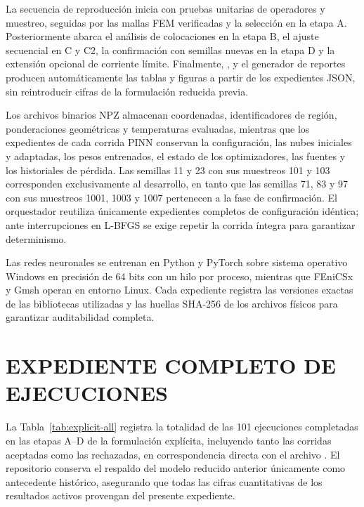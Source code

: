 La secuencia de reproducción inicia con pruebas unitarias de operadores y muestreo, seguidas por las mallas FEM verificadas y la selección en la etapa A. Posteriormente abarca el análisis de colocaciones en la etapa B, el ajuste secuencial en C y C2, la confirmación con semillas nuevas en la etapa D y la extensión opcional de corriente límite. Finalmente, ,  y el generador de reportes producen automáticamente las tablas y figuras a partir de los expedientes JSON, sin reintroducir cifras de la formulación reducida previa.

Los archivos binarios NPZ almacenan coordenadas, identificadores de región, ponderaciones geométricas y temperaturas evaluadas, mientras que los expedientes de cada corrida PINN conservan la configuración, las nubes iniciales y adaptadas, los pesos entrenados, el estado de los optimizadores, las fuentes y los historiales de pérdida. Las semillas 11 y 23 con sus muestreos 101 y 103 corresponden exclusivamente al desarrollo, en tanto que las semillas 71, 83 y 97 con sus muestreos 1001, 1003 y 1007 pertenecen a la fase de confirmación. El orquestador reutiliza únicamente expedientes completos de configuración idéntica; ante interrupciones en L-BFGS se exige repetir la corrida íntegra para garantizar determinismo.

Las redes neuronales se entrenan en Python y PyTorch sobre sistema operativo Windows en precisión de 64 bits con un hilo por proceso, mientras que FEniCSx y Gmsh operan en entorno Linux. Cada expediente registra las versiones exactas de las bibliotecas utilizadas y las huellas SHA-256 de los archivos físicos para garantizar auditabilidad completa.

\section{EXPEDIENTE COMPLETO DE EJECUCIONES}
\label{anx:expediente-evidencia}

La Tabla~\ref{tab:explicit-all} registra la totalidad de las 101 ejecuciones completadas en las etapas A--D de la formulación explícita, incluyendo tanto las corridas aceptadas como las rechazadas, en correspondencia directa con el archivo . El repositorio conserva el respaldo del modelo reducido anterior únicamente como antecedente histórico, asegurando que todas las cifras cuantitativas de los resultados activos provengan del presente expediente.


